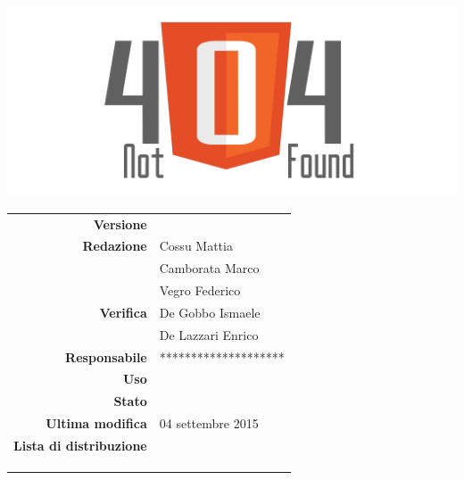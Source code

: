 \thispagestyle{empty}

\begin{titlepage}

	\begin{center}
	\begin{Huge}
		\textbf{\gruppo} \\
	\end{Huge}
	\vspace{0.5cm}
	\begin{Large}
		\textbf{\capitolato}
	\end{Large}
	
	\vspace{1cm}

	\includegraphics[scale=0.35]{../logo/logo404_Extends.png}
	\vspace{1cm}
	\begin{Huge}
		\textbf{\titDoc}
	\end{Huge}
	
	\vspace{1cm}
	
	\begin{table}[h]
	\begin{center}
	\begin{tabular}{r | l}
		\textbf{Versione} & \versione \\
		\textbf{Redazione} & Cossu Mattia \\ 
			& Camborata Marco \\ 
			& Vegro Federico \\
		\textbf{Verifica} & De Gobbo Ismaele \\ 
			& De Lazzari Enrico \\ 
		\textbf{Responsabile} & ******************** \\
		\textbf{Uso} & \uso \\
		\textbf{Stato} & \stato \\
		\textbf{Ultima modifica} & 04 settembre 2015 \\
		\textbf{Lista di distribuzione} & \gruppo \\ 
			& \Vardanega \\
			& \Cardin \\
			& \Zucchetti \\
	\end{tabular}
	\end{center}
	\end{table}
	\end{center}
\end{titlepage}